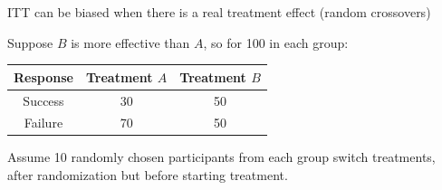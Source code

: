 \documentclass[ignorenonframetext,]{beamer}
\begin{document}
\begin{frame}{ITT can be biased when there is a real treatment effect
(random crossovers)}

Suppose \(B\) is more effective than \(A\), so for 100 in each group:

\begin{longtable}[]{@{}ccc@{}}
\toprule
\begin{minipage}[b]{0.15\columnwidth}\centering\strut
Response\strut
\end{minipage} & \begin{minipage}[b]{0.22\columnwidth}\centering\strut
Treatment \(A\)\strut
\end{minipage} & \begin{minipage}[b]{0.25\columnwidth}\centering\strut
Treatment \(B\)\strut
\end{minipage}\tabularnewline
\midrule
\endhead
\begin{minipage}[t]{0.15\columnwidth}\centering\strut
Success\strut
\end{minipage} & \begin{minipage}[t]{0.22\columnwidth}\centering\strut
30\strut
\end{minipage} & \begin{minipage}[t]{0.25\columnwidth}\centering\strut
50\strut
\end{minipage}\tabularnewline
\begin{minipage}[t]{0.15\columnwidth}\centering\strut
Failure\strut
\end{minipage} & \begin{minipage}[t]{0.22\columnwidth}\centering\strut
70\strut
\end{minipage} & \begin{minipage}[t]{0.25\columnwidth}\centering\strut
50\strut
\end{minipage}\tabularnewline
\bottomrule
\end{longtable}

Assume 10 randomly chosen participants from each group switch
treatments, after randomization but before starting treatment.

\end{frame}
\end{document}
